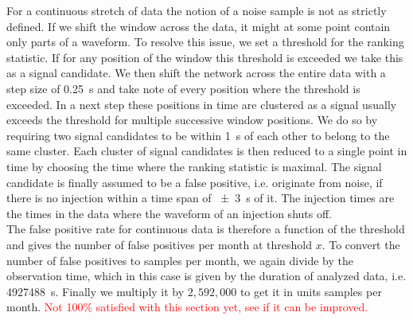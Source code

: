 For a continuous stretch of data the notion of a noise sample is not as strictly defined. If we shift the window across the data, it might at some point contain only parts of a waveform. To resolve this issue, we set a threshold for the ranking statistic. If for any position of the window this threshold is exceeded we take this as a signal candidate. We then shift the network across the entire data with a step size of \SI{0.25}{\s} and take note of every position where the threshold is exceeded. In a next step these positions in time are clustered as a signal usually exceeds the threshold for multiple successive window positions. We do so by requiring two signal candidates to be within \SI{1}{\s} of each other to belong to the same cluster. Each cluster of signal candidates is then reduced to a single point in time by choosing the time where the ranking statistic is maximal. The signal candidate is finally assumed to be a false positive, i.e. originate from noise, if there is no injection within a time span of \SI{\pm 3}{\s} of it. The injection times are the times in the data where the waveform of an injection shuts off.\\
The false positive rate for continuous data is therefore a function of the threshold and gives the number of false positives per month at threshold $x$. To convert the number of false positives to samples per month, we again divide by the observation time, which in this case is given by the duration of analyzed data, i.e. \SI{4927488}{\s}. Finally we multiply it by $2,592,000$ to get it in units samples per month. \textcolor{red}{Not 100\% satisfied with this section yet, see if it can be improved.}

